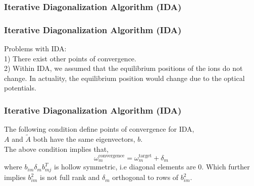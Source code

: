 \documentclass[10pt]{beamer}
\begin{document}
\begin{frame}[t]
\frametitle{Iterative Diagonalization Algorithm (IDA)}
\end{frame}

\begin{frame}
\frametitle{Iterative Diagonalization Algorithm (IDA)}
Problems with IDA: \\
1) There exist other points of convergence. \\[10pt]
2) Within IDA, we assumed that the equilibrium positions of the ions do not change. In actuality, the equilibrium position would change due to the optical potentials.
\end{frame}

\begin{frame}
\frametitle{Iterative Diagonalization Algorithm (IDA)}
The following condition define points of convergence for IDA, \\
$A$ and $\tilde{A}$ both have the same eigenvectors, $b$. \\
The above condition implies that,
\begin{equation*}
\omega^{\mathrm{convergence}}_m = \omega^{\mathrm{target}}_m + \delta_m
\end{equation*}
where $b_{im} \delta_m b^{T}_{mj}$ is hollow symmetric, i.e diagonal elements are 0.
Which further implies $b^2_{im}$ is not full rank and $\delta_m$ orthogonal to rows of $b^2_{im}$.

\end{frame}
\end{document}
